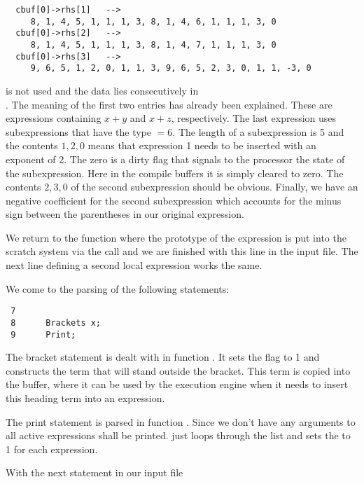 \begin{verbatim}
  cbuf[0]->rhs[1]   -->
     8, 1, 4, 5, 1, 1, 1, 3, 8, 1, 4, 6, 1, 1, 1, 3, 0
  cbuf[0]->rhs[2]   -->
     8, 1, 4, 5, 1, 1, 1, 3, 8, 1, 4, 7, 1, 1, 1, 3, 0
  cbuf[0]->rhs[3]   -->
     9, 6, 5, 1, 2, 0, 1, 1, 3, 9, 6, 5, 2, 3, 0, 1, 1, -3, 0
\end{verbatim}

 is not used and the data lies consecutively in \\
. The meaning of the first two entries has already been
explained. These are expressions containing $x+y$ and $x+z$, respectively.
The last expression uses subexpressions that have the type 
$ = 6$. The length of a subexpression is 5 and the contents $1,2,0$ means
that expression 1 needs to be inserted with an exponent of 2. The zero is a
dirty flag that signals to the processor the state of the subexpression. Here in
the compile buffers it is simply cleared to zero. The contents $2,3,0$ of the
second subexpression should be obvious. Finally, we have an negative
coefficient for the second subexpression which accounts for the minus sign
between the parentheses in our original expression.

We return to the function  where the prototype of the expression is
put into the scratch system via the call  and we are finished with
this line in the input file. The next line defining a second local expression
works the same.

We come to the parsing of the following statements:

\begin{verbatim}
 7      
 8      Brackets x;
 9      Print;
\end{verbatim}

The bracket statement is dealt with in function . It sets the
flag  to 1 and constructs the term that will stand outside the
bracket. This term is copied into the  buffer, where it can be
used by the execution engine when it needs to insert this heading term into an
expression.

The print statement is parsed in function . Since we don't have any
arguments to  all active expressions shall be printed.
 just loops through the  list and sets the
 to 1 for each expression.

With the next statement in our input file

